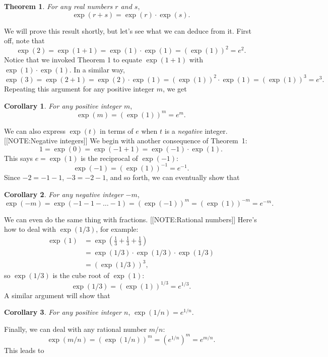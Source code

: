 {\bf Theorem 1}.  {\em For any real numbers\/ $r$ and\/ $s$},
	\[
\exp(r+s) = \exp(r) \cdot \exp(s).
\]

We will prove this result shortly, but let's see what we can deduce
from it.  First off, note that
\[
\exp(2) = \exp(1+1) = \exp(1) \cdot \exp(1) = 
		\left(\exp(1)\right)^2=e^2.
\]
Notice that we invoked Theorem 1 to equate $\exp(1+1)$ with $\exp(1) \cdot \exp(1)$.  In a similar way,
	\[
\exp(3) = \exp(2+1) = \exp(2) \cdot \exp(1) = 
		\left(\exp(1)\right)^2 \cdot \exp(1) = 
		\left(\exp(1)\right)^3=e^3.
\]
Repeating this argument for any positive integer $m$, we get



{\bf Corollary 1}.  {\em For any positive integer $m$},	\[
\exp(m) = \left(\exp(1)\right)^m = e^m.
\]

We can also express $\exp(t)$ in terms of $e $ when $t$ is a {\em
  negative\/} integer.
[[NOTE:Negative integers]]
We begin with another consequence of Theorem~1:
	\[
1 = \exp(0) = \exp(-1+1) = \exp(-1) \cdot \exp(1).
\]
This says $e = \exp(1)$ is the reciprocal of $\exp(-1)$:
	\[
\exp(-1) = \left(\exp(1)\right)^{-1} = e^{-1}.
\]
Since $-2 = -1 - 1$, $-3 = -2 - 1$, and so forth, we can eventually show that



{\bf Corollary 2}.  {\em For any negative integer $-m$},	\[
\exp(-m) = \exp(-1-1-\ldots -1)=\left(\exp(-1)\right)^{m}=\left(\exp(1)\right)^{-m} = e^{-m}.
\]

	We can even do the same thing with fractions.  
	[[NOTE:Rational numbers]]
Here's how to deal with $\exp(1/3)$, for example:
	\begin{align*}
\exp(1) &= \exp\left(\tfrac{1}{3} 
		+ \tfrac{1}{3} + \tfrac{1}{3}\right)  \\
	&= \exp(1/3) \cdot \exp(1/3) \cdot \exp(1/3) \\
	&= \left( \exp(1/3) \right)^3,
	\end{align*}
so $\exp(1/3)$ is the cube root of $\exp(1)$:
	\[
\exp(1/3) = \left( \exp(1) \right)^{1/3} = e^{1/3}.
\]
A similar argument will show that 






{\bf Corollary 3}.  {\em For any positive integer $n$}, $\exp(1/n) =
e^{1/n}$.




Finally, we can deal with any rational number $m/n$:
	\[
\exp(m/n) = \left( \exp(1/n) \right)^m = 
		\left( e^{1/n} \right)^m = e^{m/n}.
\]
This leads to





